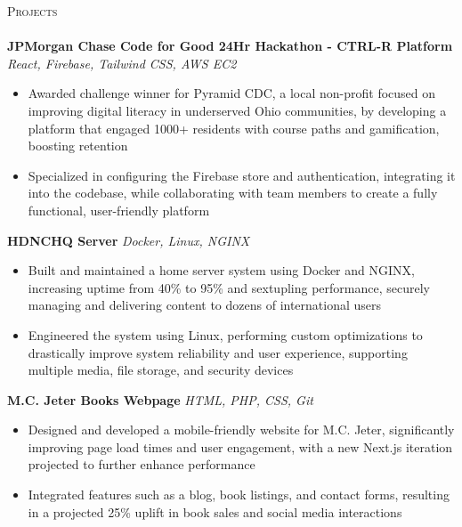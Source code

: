 \documentclass[letterpaper]{article}
\newcommand{\lineunder} {
    \vspace*{-8pt} \\
    \hspace*{-18pt} \hrulefill \\
}
\newcommand{\header} [1] {
    {\hspace*{-18pt}\vspace*{6pt} \textsc{#1}}
    \vspace*{-6pt} \lineunder
}
\begin{document}
\header{Projects}

    {\textbf{JPMorgan Chase Code for Good 24Hr Hackathon - CTRL-R Platform}} {\sl React, Firebase, Tailwind CSS, AWS EC2}\\
    \vspace{-2mm}
    \begin{itemize} \itemsep -1mm
    
        \item Awarded challenge winner for Pyramid CDC, a local non-profit focused on improving digital literacy in underserved Ohio communities, by developing a platform that engaged 1000+ residents with course paths and gamification, boosting retention

        \item Specialized in configuring the Firebase store and authentication, integrating it into the codebase, while collaborating with team members to create a fully functional, user-friendly platform

    \end{itemize}
    \vspace{-2mm}

    {\textbf{HDNCHQ Server}} {\sl Docker, Linux, NGINX} \\
    \vspace{-2mm}
    \begin{itemize} \itemsep -1mm

        \item Built and maintained a home server system using Docker and NGINX, increasing uptime from 40\% to 95\% and sextupling performance, securely managing and delivering content to dozens of international users
        
        \item Engineered the system using Linux, performing custom optimizations to drastically improve system reliability and user experience, supporting multiple media, file storage, and security devices
        
    \end{itemize}
    \vspace{-2mm}

    {\textbf{M.C. Jeter Books Webpage}} {\sl HTML, PHP, CSS, Git} \\
    \vspace{-2mm}
    \begin{itemize} \itemsep -1mm

        \item Designed and developed a mobile-friendly website for M.C. Jeter, significantly improving page load times and user engagement, with a new Next.js iteration projected to further enhance performance

        \item Integrated features such as a blog, book listings, and contact forms, resulting in a projected 25\% uplift in book sales and social media interactions
            
    \end{itemize}
    \vspace{-2mm}
\end{document}
